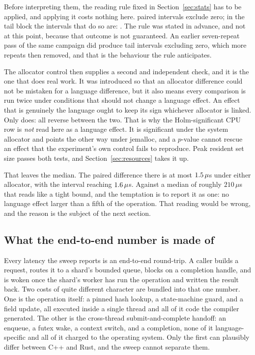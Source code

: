 \documentclass[english,twoside,openright,a4paper,censored,csm,software-track-2020]{HYthesisML}
\begin{document}
Before interpreting them, the reading rule fixed in Section~\ref{sec:stats} has to be applied,
and applying it costs nothing here. \NExclZero{} paired intervals exclude zero; in the tail block
the intervals that do so are: \TailExclZeroRows. The rule was stated in advance, and not at this
point, because that outcome is not guaranteed. An earlier seven-repeat pass of the same campaign
did produce tail intervals excluding zero, which more repeats then removed, and that is the
behaviour the rule anticipates.

The allocator control then supplies a second and independent check, and it is the one that does
real work. It was introduced so that an allocator difference could not be mistaken for a
language difference, but it also means every comparison is run twice under conditions that
should not change a language effect. An effect that is genuinely the language ought to keep
its sign whichever allocator is linked. Only \CrossAllocConsistent{} does:
\CrossAllocReversed{} all reverse between the two. That is why the Holm-significant CPU row is
\emph{not} read here as a language effect. It is significant under the system allocator and
points the other way under jemalloc, and a $p$-value cannot rescue an effect that the
experiment's own control fails to reproduce. Peak resident set size passes both tests, and
Section~\ref{sec:resources} takes it up.

That leaves the median. The paired difference there is at most $1.5\,\mu$s under
either allocator, with the interval reaching $1.6\,\mu$s. Against a median of
roughly $210\,\mu$s that reads like a tight bound, and the temptation is to report it as one: no
language effect larger than a fifth of the operation. That reading would be wrong, and the reason
is the subject of the next section.

\subsection{What the end-to-end number is made of}\label{sec:budget}
Every latency the sweep reports is an end-to-end round-trip. A caller builds a request, routes
it to a shard's bounded queue, blocks on a completion handle, and is woken once the shard's
worker has run the operation and written the result back. Two costs of quite different
character are bundled into that one number. One is the operation itself: a pinned hash lookup,
a state-machine guard, and a field update, all executed inside a single thread and all of it
code the compiler generated. The other is the cross-thread submit-and-complete handoff: an
enqueue, a futex wake, a context switch, and a completion, none of it language-specific and
all of it charged to the operating system. Only the first can plausibly differ between C++ and
Rust, and the sweep cannot separate them.
\end{document}
